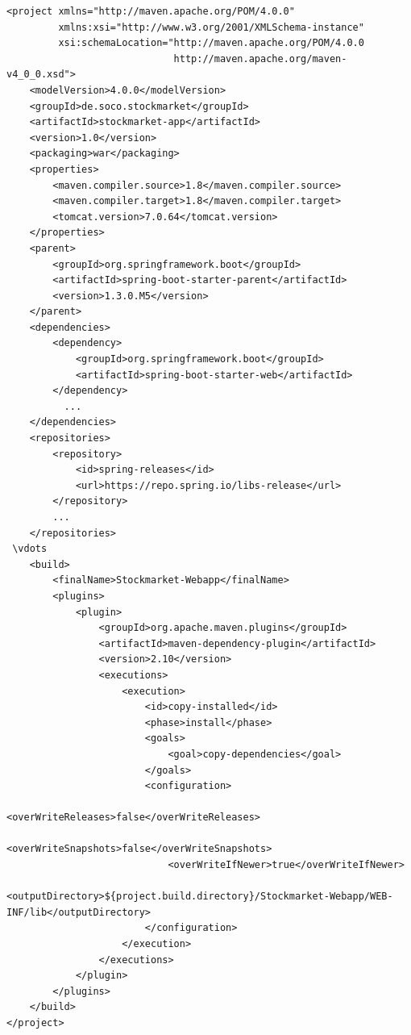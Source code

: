   
\lstset{
  numbers=left,
  stepnumber=1,    
  firstnumber=1,
  numberfirstline=true
}
\begin{lstlisting}[basicstyle=\scriptsize, caption=POM.xml Snippet - Stockmarket-Webapp]
<project xmlns="http://maven.apache.org/POM/4.0.0" 
         xmlns:xsi="http://www.w3.org/2001/XMLSchema-instance"
         xsi:schemaLocation="http://maven.apache.org/POM/4.0.0 
                             http://maven.apache.org/maven-v4_0_0.xsd">
    <modelVersion>4.0.0</modelVersion>
    <groupId>de.soco.stockmarket</groupId>
    <artifactId>stockmarket-app</artifactId>
    <version>1.0</version>
    <packaging>war</packaging>
    <properties>
        <maven.compiler.source>1.8</maven.compiler.source>
        <maven.compiler.target>1.8</maven.compiler.target>
        <tomcat.version>7.0.64</tomcat.version>
    </properties>
    <parent>
        <groupId>org.springframework.boot</groupId>
        <artifactId>spring-boot-starter-parent</artifactId>
        <version>1.3.0.M5</version>
    </parent>
    <dependencies>
        <dependency>
            <groupId>org.springframework.boot</groupId>
            <artifactId>spring-boot-starter-web</artifactId>
        </dependency>
          ...      
    </dependencies>
    <repositories>    
        <repository>
            <id>spring-releases</id>
            <url>https://repo.spring.io/libs-release</url>
        </repository>
        ...
    </repositories>
 \vdots
    <build>
        <finalName>Stockmarket-Webapp</finalName>
        <plugins>          
            <plugin>
                <groupId>org.apache.maven.plugins</groupId>
                <artifactId>maven-dependency-plugin</artifactId>
                <version>2.10</version>
                <executions>
                    <execution>
                        <id>copy-installed</id>
                        <phase>install</phase>
                        <goals>
                            <goal>copy-dependencies</goal>
                        </goals>
                        <configuration>
                            <overWriteReleases>false</overWriteReleases>
                            <overWriteSnapshots>false</overWriteSnapshots>
                            <overWriteIfNewer>true</overWriteIfNewer>
                            <outputDirectory>${project.build.directory}/Stockmarket-Webapp/WEB-INF/lib</outputDirectory>
                        </configuration>
                    </execution>
                </executions>
            </plugin>
        </plugins>
    </build>
</project>
\end{lstlisting}


